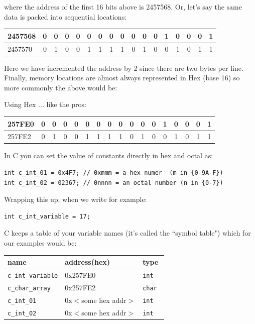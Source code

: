 \documentclass{article}	%
\begin{document}
where the address of the first 16 bits above is 2457568.  Or,
let's say the same data is packed into sequential locations:

\vspace{0.1in}
\begin{tabular}{l|c|c|c|c|c|c|c|c|c|c|c|c|c|c|c|c|}\hline
2457568& 0&0&0&0&0&0&0&0&0&0&0&1&0&0&0&1\\\hline
2457570& 0&1&0&0 & 1&1&1&1 & 0&1&0&0 & 1&0&1&1\\\hline
\end{tabular}
\vspace{0.1in}

Here we have incremented the address by 2 since there are two bytes per line. 
Finally, memory locations are almost always represented in Hex (base 16) so 
more commonly the above would be:

 Using Hex ... like the pros:

 \vspace{0.1in}

\begin{tabular}{l|c|c|c|c|c|c|c|c|c|c|c|c|c|c|c|c|}\hline
257FE0& 0&0&0&0&0&0&0&0&0&0&0&1&0&0&0&1\\\hline
257FE2& 0&1&0&0 & 1&1&1&1 & 0&1&0&0 & 1&0&1&1\\\hline
\end{tabular}
\vspace{0.1in}


In C you can set the value of constants directly in hex and octal as:	%


\begin{verbatim}
int c_int_01 = 0x4F7; // 0xmmm = a hex numer  (m in {0-9A-F})
int c_int_02 = 02367; // 0nnnn = an octal number (n in {0-7})
\end{verbatim}


Wrapping this up, when we write for example:

\begin{verbatim}
int c_int_variable = 17;
\end{verbatim}

C keeps a table of your variable names (it's called the ``symbol table") which 
for our examples would be:

\begin{tabular}{l|l|l}\\
name & address(hex) & type \\ \hline
{\tt c\_int\_variable} & 0x257FE0 & {\tt int} \\
{\tt c\_char\_array}   & 0x257FE2   & {\tt char } \\
{\tt c\_int\_01} & 0x$<$some hex addr$>$ & {\tt int} \\
{\tt c\_int\_02} & 0x$<$some hex addr$>$ & {\tt int} \\
\end{tabular}
\end{document}
